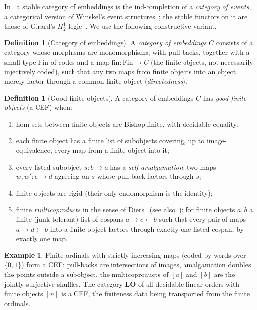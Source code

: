\documentclass[11pt]{article}
\theoremstyle{definition}
\newtheorem{definition}[theorem]{Definition}
\newtheorem{example}[theorem]{Example}
\theoremstyle{remark}
\newcommand{\LO}{\mathbf{LO}}
\newcommand{\Fin}{\mathrm{Fin}}
\begin{document}
In~\cite{Coq89} a stable category of embeddings is the ind-completion of a
\emph{category of events}, a categorical version of Winskel's event
structures~\cite{Win}; the stable functors on it are those of Girard's
$\Pi^1_2$-logic~\cite{Gir81}. We use the following constructive variant.

\begin{definition}[Category of embeddings]
A \emph{category of embeddings} $C$ consists of a category whose morphisms
are monomorphisms, with pull-backs, together with a small type $\Fin$ of
codes and a map $\mathrm{fin}:\Fin\to C$ (the finite objects, not
necessarily injectively coded), such that any two maps from finite objects
into an object merely factor through a common finite object
(\emph{directedness}).
\end{definition}

\begin{definition}[Good finite objects]
A category of embeddings $C$ has \emph{good finite objects} (a CEF) when:
\begin{enumerate}
\item hom-sets between finite objects are Bishop-finite, with decidable
  equality;
\item each finite object has a finite list of subobjects covering, up to
  image-equivalence, every map from a finite object into it;
\item every listed subobject $s:b\to a$ has a \emph{self-amalgamation}: two
  maps $w,w':a\to d$ agreeing on $s$ whose pull-back factors through $s$;
\item finite objects are rigid (their only endomorphism is the identity);
\item finite \emph{multicoproducts} in the sense of Diers~\cite{Die80}
  (see also~\cite{Osm1,Osm2}): for finite
  objects $a,b$ a finite (junk-tolerant) list of cospans $a\to c\leftarrow
  b$ such that every pair of maps $a\to d\leftarrow b$ into a finite object
  factors through exactly one listed cospan, by exactly one map.
\end{enumerate}
\end{definition}

\begin{example}
Finite ordinals with strictly increasing maps (coded by words over
$\{0,1\}$) form a CEF: pull-backs are intersections of images, amalgamation
doubles the points outside a subobject, the multicoproducts of $[a]$ and
$[b]$ are the jointly surjective shuffles.  The category $\LO$ of all
decidable linear orders with finite objects $[n]$ is a CEF, the finiteness
data being transported from the finite ordinals.
\end{example}
\end{document}
